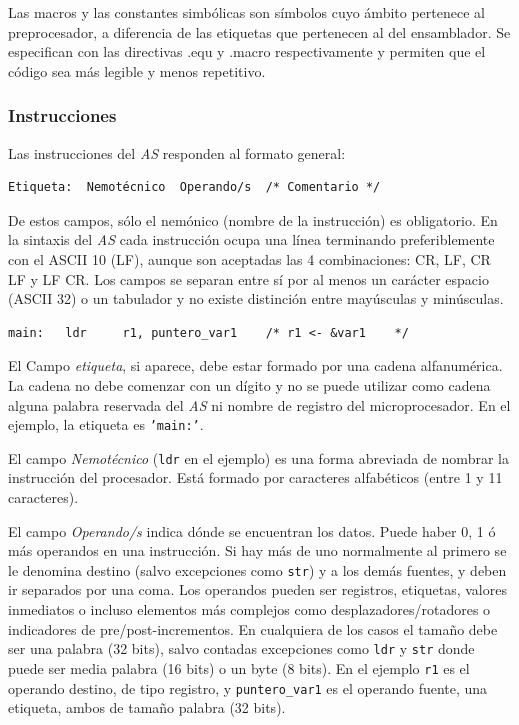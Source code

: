 Las macros y las constantes simbólicas son símbolos cuyo ámbito pertenece al preprocesador,
a diferencia de las etiquetas que pertenecen al del ensamblador. Se especifican con las
directivas .equ y .macro respectivamente y permiten que el código sea más legible y menos
repetitivo.

\subsubsection{Instrucciones}

Las instrucciones del {\it AS} responden al formato general:


\begin{lstlisting}
Etiqueta:  Nemotécnico  Operando/s  /* Comentario */
\end{lstlisting}

De estos campos, sólo el nemónico (nombre de la instrucción) es obligatorio. En
la sintaxis del {\it AS} cada instrucción ocupa una línea terminando preferiblemente
con el ASCII 10 (LF), aunque son aceptadas las 4 combinaciones: CR, LF, CR LF y LF CR.
Los campos se separan entre sí por al menos un carácter espacio (ASCII 32) o un tabulador
y no existe distinción entre mayúsculas y minúsculas.

\begin{lstlisting}
main:   ldr     r1, puntero_var1    /* r1 <- &var1    */
\end{lstlisting}

El Campo {\it etiqueta}, si aparece, debe estar formado por una
cadena alfanumérica. La cadena no debe comenzar con un dígito y no se puede
utilizar como cadena alguna palabra reservada del {\it AS} ni nombre
de registro del microprocesador. En el ejemplo, la etiqueta es
{\tt 'main:'}.

El campo \textit{Nemotécnico} ({\tt ldr} en el ejemplo) es una forma
abreviada de nombrar la instrucción del procesador.
Está formado por caracteres alfabéticos (entre 1 y 11 caracteres).

El campo \textit{Operando/s} indica dónde se encuentran los datos.
Puede haber 0, 1 ó más operandos en una instrucción. Si hay más de uno
normalmente al primero se le denomina destino (salvo excepciones como {\tt str})
y a los demás fuentes, y deben ir separados por una coma.
Los operandos pueden ser registros, etiquetas, valores inmediatos o incluso
elementos más complejos como desplazadores/rotadores o indicadores de
pre/post-incrementos. En cualquiera de los casos el tamaño debe ser una
palabra (32 bits), salvo contadas excepciones como {\tt ldr} y {\tt str}
donde puede ser media palabra (16 bits) o un byte (8 bits).
En el ejemplo {\tt r1} es el operando destino, de tipo registro,
y {\tt puntero\_var1} es el operando fuente, una etiqueta, ambos
de tamaño palabra (32 bits).

